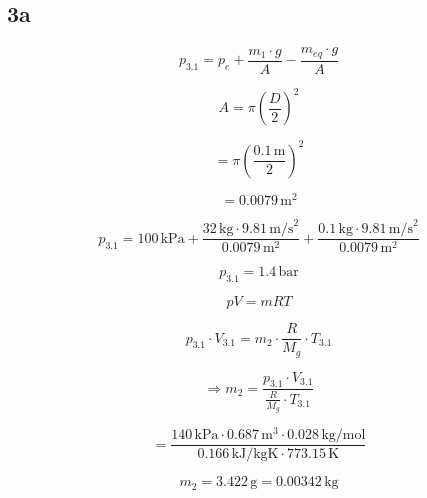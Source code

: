 

\subsection*{3a}

\begin{equation*}
    p_{3.1} = p_e + \frac{m_1 \cdot g}{A} - \frac{m_{eq} \cdot g}{A}
\end{equation*}

\begin{equation*}
    A = \pi \left( \frac{D}{2} \right)^2
\end{equation*}

\begin{equation*}
    = \pi \left( \frac{0.1 \, \text{m}}{2} \right)^2
\end{equation*}

\begin{equation*}
    = 0.0079 \, \text{m}^2
\end{equation*}

\begin{equation*}
    p_{3.1} = 100 \, \text{kPa} + \frac{32 \, \text{kg} \cdot 9.81 \, \text{m/s}^2}{0.0079 \, \text{m}^2} + \frac{0.1 \, \text{kg} \cdot 9.81 \, \text{m/s}^2}{0.0079 \, \text{m}^2}
\end{equation*}

\begin{equation*}
    p_{3.1} = 1.4 \, \text{bar}
\end{equation*}

\begin{equation*}
    pV = mRT
\end{equation*}

\begin{equation*}
    p_{3.1} \cdot V_{3.1} = m_2 \cdot \frac{R}{M_g} \cdot T_{3.1}
\end{equation*}

\begin{equation*}
    \Rightarrow m_2 = \frac{p_{3.1} \cdot V_{3.1}}{\frac{R}{M_g} \cdot T_{3.1}}
\end{equation*}

\begin{equation*}
    = \frac{140 \, \text{kPa} \cdot 0.687 \, \text{m}^3 \cdot 0.028 \, \text{kg/mol}}{0.166 \, \text{kJ/kgK} \cdot 773.15 \, \text{K}}
\end{equation*}

\begin{equation*}
    m_2 = 3.422 \, \text{g} = 0.00342 \, \text{kg}
\end{equation*}

